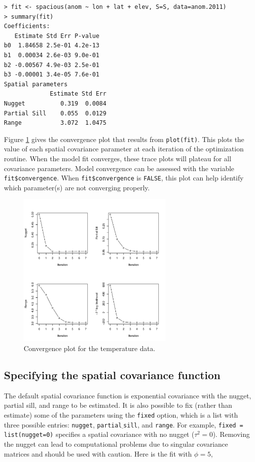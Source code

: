 \documentclass[11pt]{article}
\begin{document}
\begin{verbatim}
> fit <- spacious(anom ~ lon + lat + elev, S=S, data=anom.2011)
> summary(fit)
Coefficients:
   Estimate Std Err P-value
b0  1.84658 2.5e-01 4.2e-13
b1  0.00034 2.6e-03 9.0e-01
b2 -0.00567 4.9e-03 2.5e-01
b3 -0.00001 3.4e-05 7.6e-01
Spatial parameters
             Estimate Std Err
Nugget          0.319  0.0084
Partial Sill    0.055  0.0129
Range           3.072  1.0475
\end{verbatim}

Figure \ref{f:converge} gives the convergence plot that results from {\tt plot(fit)}.
This plots the value of each spatial covariance parameter at each iteration of the optimization routine.
When the model fit converges, these trace plots will plateau for all covariance parameters.
Model convergence can be assessed with the variable {\tt fit\$convergence}.
When {\tt fit\$convergence} is {\tt FALSE}, this plot can help identify which parameter(s) are not converging properly.

\begin{figure}
	\caption{Convergence plot for the temperature data.}\label{f:converge}
	\centering
	\includegraphics[width=3in]{figures/converge.pdf}
\end{figure}

\subsection{Specifying the spatial covariance function}
The default spatial covariance function is exponential covariance with the nugget, partial sill, and range to be estimated.
It is also possible to fix (rather than estimate) some of the parameters using the {\tt fixed} option, which is a list with three possible entries: {\tt nugget}, {\tt partial$\underline{\ }$sill}, and {\tt range}.
For example, {\tt fixed = list(nugget=0)} specifies a spatial covariance with no nugget ($\tau^2=0$).
Removing the nugget can lead to computational problems due to singular covariance matrices and should be used with caution.
Here is the fit with $\phi=5$,
\end{document}
